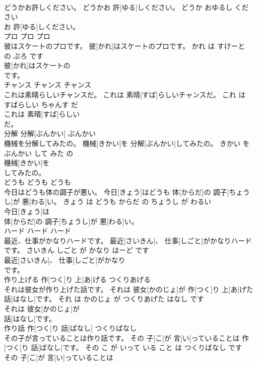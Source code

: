 \documentclass[8pt]{extreport}
\begin{document}
\begin{CJK}{UTF8}{min}
\\	どうかお許しください。	どうかお 許[ゆる]しください。	どうか おゆるし ください	
\\	お 許[ゆる]しください。			
\\	プロ	プロ	プロ	
\\	彼はスケートのプロです。	彼[かれ]はスケートのプロです。	かれ は すけーと の ぷろ です	
\\	彼[かれ]はスケートの
\\	です。			
\\	チャンス	チャンス	チャンス	
\\	これは素晴らしいチャンスだ。	これは 素晴[すば]らしいチャンスだ。	これ は すばらしい ちゃんす だ	
\\	これは 素晴[すば]らしい
\\	だ。			
\\	分解	分解[ぶんかい]	ぶんかい	
\\	機械を分解してみたの。	機械[きかい]を 分解[ぶんかい]してみたの。	きかい を ぶんかい して みた の	
\\	機械[きかい]を
\\	してみたの。			
\\	どうも	どうも	どうも	
\\	今日はどうも体の調子が悪い。	今日[きょう]はどうも 体[からだ]の 調子[ちょうし]が 悪[わる]い。	きょう は どうも からだ の ちょうし が わるい	
\\	今日[きょう]は
\\	体[からだ]の 調子[ちょうし]が 悪[わる]い。			
\\	ハード	ハード	ハード	
\\	最近、仕事がかなりハードです。	最近[さいきん]、 仕事[しごと]がかなりハードです。	さいきん しごと が かなり はーど です	
\\	最近[さいきん]、 仕事[しごと]がかなり
\\	です。			
\\	作り上げる	作[つく]り 上[あ]げる	つくりあげる	
\\	それは彼女が作り上げた話です。	それは 彼女[かのじょ]が 作[つく]り 上[あ]げた 話[はなし]です。	それ は かのじょ が つくりあげた はなし です	
\\	それは 彼女[かのじょ]が
\\	話[はなし]です。			
\\	作り話	作[つく]り 話[ばなし]	つくりばなし	
\\	その子が言っていることは作り話です。	その 子[こ]が 言[い]っていることは 作[つく]り 話[ばなし]です。	その こ が いって いる こと は つくりばなし です	
\\	その 子[こ]が 言[い]っていることは

\end{CJK}
\end{document}
